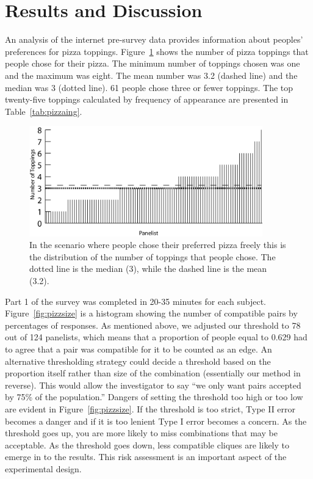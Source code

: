 \section{Results and Discussion}
An analysis of the internet pre-survey data provides information about peoples’ preferences for pizza toppings.  Figure~\ref{fig:pizztoppings} shows the number of pizza toppings that people chose for their pizza.  The minimum number of toppings chosen was one and the maximum was eight.  The mean number was 3.2 (dashed line) and the median was 3 (dotted line).  61 people chose three or fewer toppings.  The top twenty-five toppings calculated by frequency of appearance are presented in Table~\ref{tab:pizzaing}.

\begin{figure}[h!]
\caption[The number of toppings people chose in free-choice portion of experiment.]{In the scenario where people chose their preferred pizza freely this is the distribution of  the number of toppings that people chose.  The dotted line is the median (3), while the dashed line is the mean (3.2).}
\label{fig:pizztoppings}
\centering
\includegraphics[width=0.9\textwidth]{./img/Figure41.png}
\end{figure}

Part 1 of the survey was completed in 20-35 minutes for each subject.  Figure~\ref{fig:pizzsize} is a histogram showing the number of compatible pairs by percentages of responses.  As mentioned above, we adjusted our threshold to 78 out of 124 panelists, which means that a proportion of people equal to 0.629 had to agree that a pair was compatible for it to be counted as an edge.  An alternative thresholding strategy could decide a threshold based on the proportion itself rather than size of the combination (essentially our method in reverse).  This would allow the investigator to say “we only want pairs accepted by 75\% of the population.”  Dangers of setting the threshold too high or too low are evident in Figure~\ref{fig:pizzsize}.  If the threshold is too strict, Type II error becomes a danger and if it is too lenient Type I error becomes a concern.  As the threshold goes up, you are more likely to miss combinations that may be acceptable.  As the threshold goes down, less compatible cliques are likely to emerge in to the results.  This risk assessment is an important aspect of the experimental design.

